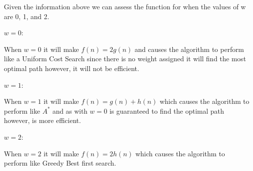 \documentclass[10pt,a4paper]{article}
\begin{document}
\begin{enumerate}[A.]
		Given the information above we can assess the function for when the values of w are 0, 1, and 2.
		
		$w = 0$:
		
		When $w = 0$ it will make $f(n) = 2g(n)$ and causes the algorithm to perform like a Uniform Cost Search since there is no weight assigned it will find the most optimal path however, it will not be efficient.
		
		$w = 1$:

		When $w = 1$ it will make $f(n) = g(n) + h(n)$ which causes the algorithm to perform like $A^*$ and as with $w=0$ is guaranteed to find the optimal path however, is more efficient.
		
		$w = 2$: 
		
		When $w = 2$ it will make $f(n) = 2h(n)$ which causes the algorithm to perform like Greedy Best first search.
		
	\end{enumerate}
		
\end{document}
